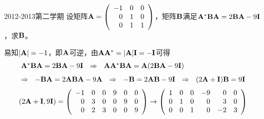 \begin{frame}
\begin{footnotesize}
\begin{exampleblock}{2012-2013第二学期}
设矩阵$\mathbf{A}=\left(
\begin{array}{rrr}
-1&0&0\\
 0&1&0\\
 0&1&1
\end{array}
\right)$，矩阵$\mathbf{B}$满足$\mathbf{A}^*\mathbf{B}\mathbf{A}=2\mathbf{B}\mathbf{A}-9\mathbf{I}$，求$\mathbf{B}$。
\end{exampleblock}
\pause\jiename
易知$|\mathbf{A}|=-1$，即$\mathbf{A}$可逆，由$\mathbf{A}\mathbf{A}^*=|\mathbf{A}|\mathbf{I}=-\mathbf{I}$可得
$$
\begin{array}{l}
\mathbf{A}^*\mathbf{B}\mathbf{A}=2\mathbf{B}\mathbf{A}-9\mathbf{I} ~~\Rightarrow~~
\mathbf{A}\mathbf{A}^*\mathbf{B}\mathbf{A}=\mathbf{A}(2\mathbf{B}\mathbf{A}-9\mathbf{I}) \\[0.1in]
\Rightarrow~~
-\mathbf{B}\mathbf{A}=2\mathbf{A}\mathbf{B}\mathbf{A}-9\mathbf{A} ~~\Rightarrow~~
-\mathbf{B}=2\mathbf{A}\mathbf{B}-9\mathbf{I}   ~~\Rightarrow~~
(2\mathbf{A}+\mathbf{I})\mathbf{B}=9\mathbf{I}
\end{array}
$$
$$
\begin{array}{l}
(2\mathbf{A}+\mathbf{I}, 9\mathbf{I})=\left(
\begin{array}{rrrrrr}
  -1   &  0  &   0 &  9&0&0\\
  0    & 3   &  0  &  0&9&0\\
  0    & 2   &  3  &  0&0&9
\end{array}
\right)  \rightarrow
\left(
\begin{array}{rrrrrr}
  1   &  0  &   0 & -9&0&0\\
  0    & 1   &  0  &  0&3&0\\
  0    & 0   &  1  &  0&-2&3
\end{array}
\right)  
\end{array}
$$
\end{footnotesize}
\end{frame}


